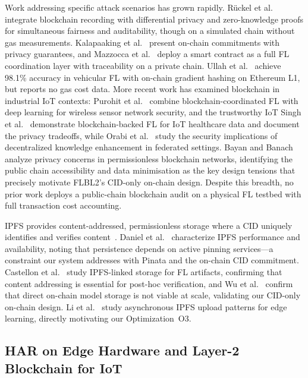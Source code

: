 \documentclass{llncs}
\begin{document}
Work addressing specific attack scenarios has grown rapidly. Rückel et
al.~\cite{ruckel2022fairness} integrate blockchain recording with
differential privacy and zero-knowledge proofs for simultaneous fairness and
auditability, though on a simulated chain without gas measurements.
Kalapaaking et al.~\cite{kalapaaking2024auditable} present on-chain
commitments with privacy guarantees, and Mazzocca et
al.~\cite{mazzocca2025fedcoordination} deploy a smart contract as a full
FL coordination layer with traceability on a private chain. Ullah et
al.~\cite{ullah2025spbfl} achieve 98.1\% accuracy in vehicular FL with
on-chain gradient hashing on Ethereum L1, but reports no gas cost data.
More recent work has examined blockchain in industrial IoT contexts:
Purohit et al.~\cite{purohit2024fedblocks} combine blockchain-coordinated FL with deep
learning for wireless sensor network security, and the trustworthy IoT
Singh et al.~\cite{singh2022framework} demonstrate
blockchain-backed FL for IoT healthcare data and document the privacy
tradeoffs, while Orabi et al.~\cite{orabi2025adapting} study the security
implications of decentralized knowledge enhancement in federated settings.
Bayan and Banach~\cite{bayan2023exploring} analyze privacy concerns
in permissionless blockchain networks, identifying the public chain
accessibility and data minimisation as the key design tensions that
precisely motivate FLBL2's CID-only on-chain design.
Despite this breadth, no prior work deploys a public-chain blockchain audit
on a physical FL testbed with full transaction cost accounting.

IPFS provides content-addressed, permissionless storage where a CID
uniquely identifies and verifies content~\cite{benet2014ipfs}. Daniel et
al.~\cite{daniel2022ipfs} characterize IPFS performance and availability,
noting that persistence depends on active pinning services---a constraint
our system addresses with Pinata and the on-chain CID commitment.
Castellon et al.~\cite{castellon2022ipls} study IPFS-linked storage for
FL artifacts, confirming that content addressing is essential for
post-hoc verification, and Wu et al.~\cite{wu2026bfmil} confirm that
direct on-chain model storage is not viable at scale, validating our
CID-only on-chain design. Li et al.~\cite{li2025asyncipfs} study
asynchronous IPFS upload patterns for edge learning, directly motivating
our Optimization~O3.

\subsection{HAR on Edge Hardware and Layer-2 Blockchain for IoT}
\end{document}
